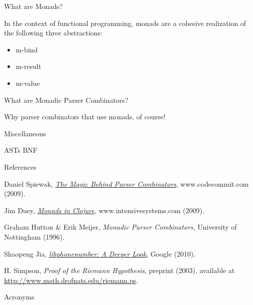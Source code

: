 \documentclass[presentation]{beamer}
\begin{document}
\begin{frame}{What are Monads?}

  In the context of functional programming, monads are a cohesive
  realization of the following three abstractions:

  \begin{itemize}

\item m-bind
\item m-result
\item m-value
\end{itemize}

\end{frame}

\begin{frame}{What are Monadic Parser Combinators?}

Why parser combinators that use monads, of course!

\end{frame}

\begin{frame}{Miscellaneous}

  \ac{AST}s
  \ac{BNF}

\end{frame}

\begin{frame}{References}

\begin{thebibliography}{9}

 Daniel Spiewak,
\href{http://www.codecommit.com/blog/scala/the-magic-behind-parser-combinators}{\emph{The
Magic Behind Parser Combinators}}, www.codecommit.com (2009).

 Jim Duey,
\href{http://www.intensivesystems.net/tutorials/monads_101.html}{\emph{Monads in Clojure}},
www.intensivesystems.com (2009).

 Graham Hutton \& Erik Meijer, \emph{Monadic Parser Combinators}, University
of Nottingham (1996).

 Shaopeng Jia,
\href{https://docs.google.com/present/view?id=0Ae6JSEqM3Qz6ZDk0bmd3d18yODRmejZ2N21kdw}{\emph{libphonenumber:
    A Deeper Look}}, Google (2010).

 H. Simpson, \emph{Proof of the Riemann
Hypothesis},  preprint (2003), available at
\url{http://www.math.drofnats.edu/riemann.ps}.

\end{thebibliography}

\end{frame}

\begin{frame}{Acronyms}
  \begin{acronym}[BNF]
  \end{acronym}
\end{frame}
\end{document}

